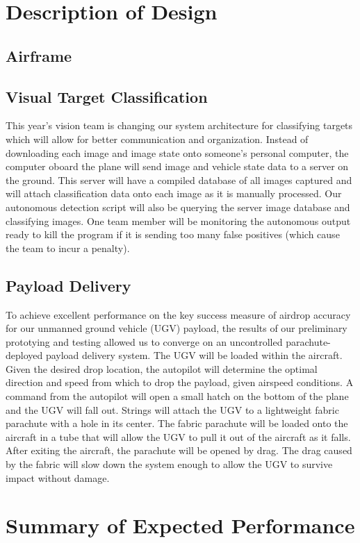 \documentclass[]{auvsi_doc}
\begin{document}
\section{Description of Design}
\subsection{Airframe}
\subsection{Visual Target Classification}
This year's vision team is changing our system architecture for classifying targets which will
allow for better communication and organization. Instead of downloading each image and image state
onto someone's personal computer, the computer oboard the plane will send image and vehicle state
data to a server on the ground. This server will have a compiled database of all images captured
and will attach classification data onto each image as it is manually processed. Our
autonomous detection script will also be querying the server image database and classifying
images. One team member will be monitoring the autonomous output ready to kill the
program if it is sending too many false positives (which cause the team to incur a
penalty).
\subsection{Payload Delivery}
To achieve excellent performance on the key success measure of airdrop accuracy for our unmanned ground vehicle (UGV) payload, the results of our preliminary prototying and testing allowed us to converge on an uncontrolled parachute-deployed payload delivery system. The UGV will be loaded within the aircraft. Given the desired drop location, the autopilot will determine the optimal direction and speed from which to drop the payload, given airspeed conditions. A command from the autopilot will open a small hatch on the bottom of the plane and the UGV will fall out. Strings will attach the UGV to a lightweight fabric parachute with a hole in its center. The fabric parachute will be loaded onto the aircraft in a tube that will allow the UGV to pull it out of the aircraft as it falls. After exiting the aircraft, the parachute will be opened by drag. The drag caused by the fabric will slow down the system enough to allow the UGV to survive impact without damage.
\section{Summary of Expected Performance}
\end{document}
